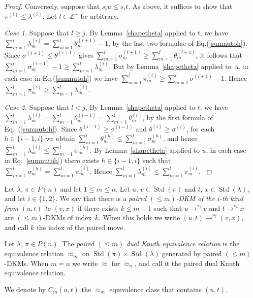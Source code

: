 \documentclass[ALCO,ThmDefs,Unicode,epreuves]{cedram}
\newenvironment{Case}[1]{\smallskip\noindent\emph{Case #1}\endgraf
 \nobreak\noindent\ignorespaces}{\endgraf\smallskip}
\DeclareMathOperator{\STD}{Std}
\begin{document}
\begin{proof}
Conversely, suppose that $s_iu\leqslant s_it$. As above, it suffices to show that
$\pi^{(i)}\leqslant\lambda^{(i)}$. Let $l\in\mathbb{Z}^+$ be arbitrary.

\begin{Case}{1.}
Suppose that $l\geqslant j$. By Lemma~\ref{shapetheta} applied to $t$,
we have $\sum_{m=1}^l \lambda^{(i)}_m = \sum_{m=1}^l \theta^{(i+1)}_m - 1$,
by the last two formulae of Eq.(\ref{sumnutoh}).
Since $\sigma^{(i+1)}\leqslant\theta^{(i+1)}$ gives
$\sum_{m=1}^l \sigma^{(i+1)}_m \geqslant \sum_{m=1}^l \theta^{(i+1)}_m$,
it follows that
$\sum_{m=1}^l \sigma^{(i+1)}_m - 1\geqslant \sum_{m=1}^l \lambda^{(i)}_m$.
But by Lemma~\ref{shapetheta} applied to~$u$, in each case
in Eq.(\ref{sumnutoh}) we have
$\sum_{m=1}^l \pi^{(i)}_m\geqslant \sum_{m=1}^l \sigma^{(i+1)}-1$.
Hence $\sum_{m=1}^l \pi^{(i)}_m \geqslant \sum_{m=1}^l \lambda^{(i)}_m$.
\end{Case}

\begin{Case}{2.}
Suppose that $l<j$. By Lemma~\ref{shapetheta} applied to $t$, we have
$\sum_{m=1}^l \lambda^{(i)}_m = \sum_{m=1}^l \theta^{(i-1)}_m=\sum_{m=1}^l \theta^{(i)}_m$,
by the first formula of Eq.~(\ref{sumnutoh}). Since $\theta^{(i-1)}\geqslant\sigma^{(i-1)}$ and
$\theta^{(i)}\geqslant\sigma^{(i)}$, for each $h\in\{i-1,i\}$ we obtain
$\sum_{m=1}^l \theta^{(h)}_m\leqslant\sum_{m=1}^l \sigma^{(h)}_m$, and hence
$\sum_{m=1}^l \lambda^{(i)}_m\leqslant\sum_{m=1}^l \sigma^{(h)}_m$.
By Lemma~\ref{shapetheta} applied to $u$,
in each case in Eq.~\ref{sumnutoh}) there exists $h\in\{i-1,i\}$
such that $\sum_{m=1}^l \sigma^{(h)}_m = \sum_{m=1}^l \pi^{(i)}_m$.
Hence $\sum_{m=1}^l \lambda^{(i)}_m\leqslant\sum_{m=1}^l \pi^{(i)}_m $.\qedhere
\end{Case}
\end{proof}

\begin{defi}\label{paireddualKmove}
Let $\lambda,\,\pi\in P(n)$ and let $1\leqslant m\leqslant n$.
Let $u,\,v \in \STD(\pi)$ and $t,\,x\in\STD(\lambda)$, and let
$i\in\{1,2\}$. We say that there is a \emph{paired
$(\leqslant m)$-DKM
of the $i$-th kind from $(u,t)$ to $(v,x)$} if there
exists $k\leqslant m-1$ such that $u\to^{*i}v$ and $t\to^{*i}x$ are
$(\leqslant m)$-DKMs
of index~$k$.
When this holds we write $(u,t)\to^{*i}(v,x)$, and call $k$ the index
of the paired move.
\end{defi}
\begin{defi}
Let $\lambda,\,\pi\in P(n)$. The \emph{paired $(\leqslant m)$ dual
Knuth equivalence relation} is the equivalence relation $\approx_m$ on
$\STD(\pi)\times\STD(\lambda)$ generated by paired
$(\leqslant m)$-DKMs.
When $m=n$ we write $\approx$ for $\approx_n$, and call it
the paired dual Knuth equivalence relation.
\end{defi}
We denote by $C_m(u,t)$ the $\approx_m$ equivalence class that contains $(u,t)$.
\end{document}
